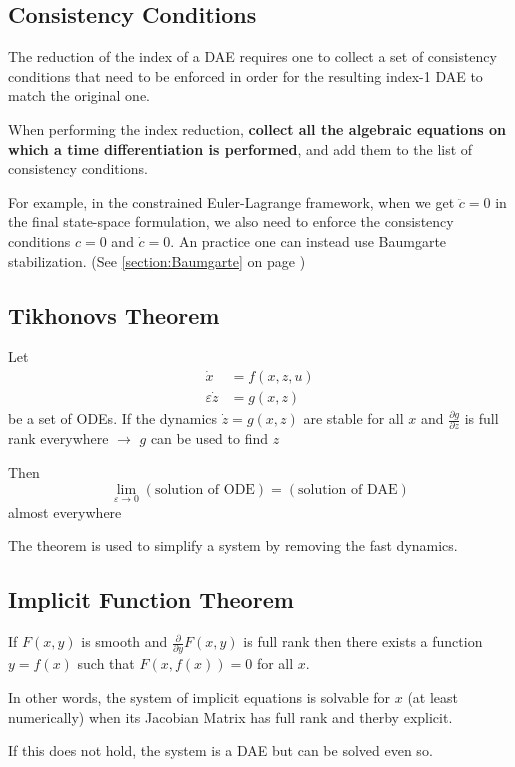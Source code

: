 
\subsection{Consistency Conditions}
The reduction of the index of a DAE requires one to collect a set of consistency conditions that need to be enforced in order for the resulting index-1 DAE to match the original one. 

When performing the index reduction, \textbf{collect all the algebraic equations on which a time differentiation is performed}, and add them to the list of consistency conditions.

For example, in the constrained Euler-Lagrange framework, when we get $\ddot c = 0$ in the final state-space formulation, we also need to enforce the consistency conditions $c=0$ and $\dot c = 0$. An practice one can instead use Baumgarte stabilization. (See \autoref{section:Baumgarte} on page \pageref{section:Baumgarte})

\subsection{Tikhonovs Theorem}
Let
\begin{equation*}
    \begin{split}
    \dot x &= f(x,z,u) \\
    \varepsilon\dot z &= g(x,z) 
    \end{split}
\end{equation*}
be a set of ODEs.
If the dynamics $\dot z = g(x, z) $ are stable for all $x$ and $\frac{\partial g}{\partial z}$ is full rank everywhere
$\rightarrow$ $g$ can be used to find $z$

Then 
$$
\lim_{\varepsilon\rightarrow0}(\text{solution of ODE}) = (\text{solution of DAE})
$$
almost everywhere

The theorem is used to simplify a system by removing the fast dynamics.

\subsection{Implicit Function Theorem}\label{section:implicit_function_theorem}
If $F(x,y)$ is smooth and $\frac{\partial}{\partial y}F(x,y)$ is full rank then there exists a function $y=f(x)$ such that $F(x,f(x))=0$ for all $x$.

In other words, the system of implicit equations is solvable for $x$ (at least numerically) when its Jacobian Matrix has full rank and therby explicit.

If this does not hold, the system is a DAE but can be solved even so.



